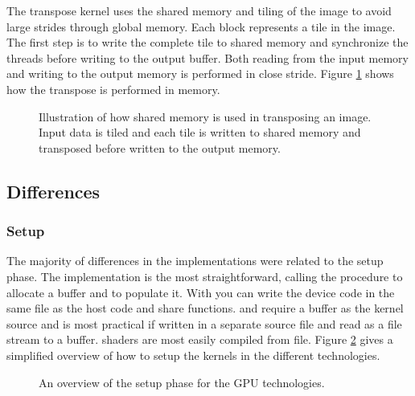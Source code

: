 The transpose kernel uses the shared memory and tiling of the image to avoid large strides through global memory. Each block represents a tile in the image. The first step is to write the complete tile to shared memory and synchronize the threads before writing to the output buffer. Both reading from the input memory and writing to the output memory is performed in close stride. Figure \ref{fig:transpose-memory} shows how the transpose is performed in memory.

\begin{figure}
	\centering
	
	\caption{Illustration of how shared memory is used in transposing an image. Input data is tiled and each tile is written to shared memory and transposed before written to the output memory. }
	\label{fig:transpose-memory}
\end{figure}

\subsection{Differences}%
\subsubsection{Setup}%
The majority of differences in the implementations were related to the setup phase. The {\CU} implementation is the most straightforward, calling the procedure  to allocate a buffer and  to populate it. With {\CU} you can write the device code in the same file as the host code and share functions. {\OCL} and {\GL} require a  buffer as the kernel source and is most practical if written in a separate source file and read as a file stream to a  buffer. {\DX} shaders are most easily compiled from file. Figure \ref{fig:code:setup} gives a simplified overview of how to setup the kernels in the different technologies.%

\begin{figure}%
	\centering%
	\def \setupWidth {\textwidth / 2 - 18pt}%
	\hfill%
	\vfill%
	\hfill%
	\caption{An overview of the setup phase for the GPU technologies.}%
	\label{fig:code:setup}%
\end{figure}%

